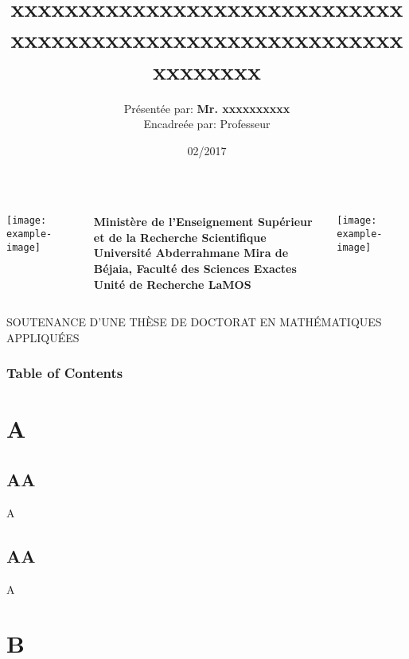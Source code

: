 \documentclass[t,compress,11pt,xcolor=dvipsnames]{beamer}
\title[xxxxxxxxxxxxxxxxxxxxxxxxxxxxxxxxxxxxxxxxxxxxxxxxxxxxxxxxxxxx]{xxxxxxxxxxxxxxxxxxxxxxxxxxxxxxxxxxxxxxxxxxxxxxxxxxxxxxxxxxxxxxxxxx}
\author[Mr. xxxxxxxx]{Pr\'{e}sent\'{e}e par: \textbf{Mr. xxxxxxxxxx}\\
Encadre\'{e}e par: Professeur}
\institute[xxxxxxxxxxsdxxxxxxxxxxxx]{ }
\date{02/2017}
\begin{document}
{
\begin{frame}
    \vskip0.5cm
    \begin{columns}[T]
        \begin{column}{1cm}
            \texttt{[image: example-image]}
        \end{column}
        \begin{column}{9cm}
            \bfseries
            \color{black}
            \fontsize{6}{6}\selectfont 
            \centering
                Minist\`{e}re de l'Enseignement  Sup\'{e}rieur et de la Recherche Scientifique \\
                Universit\'{e} Abderrahmane Mira de B\'{e}jaia, Facult\'{e} des Sciences Exactes\\
                Unit\'{e} de Recherche LaMOS
        \end{column}
        \begin{column}{2cm}
            \texttt{[image: example-image]}
        \end{column}
    \end{columns}
    \begin{center}
        SOUTENANCE D'UNE TH\`{E}SE DE DOCTORAT EN MATH\'{E}MATIQUES  APPLIQU\'{E}ES
    \end{center}
    \vskip-1cm
    \titlepage
\end{frame}
}

  \begin{frame}
  \frametitle{Table of Contents}
  \small \tableofcontents
  \end{frame}
  \section{A}
  \subsection{AA}
  \begin{frame}A\end{frame}
   \subsection{AA}
  \begin{frame}A\end{frame}
  \section{B}
\end{document}
